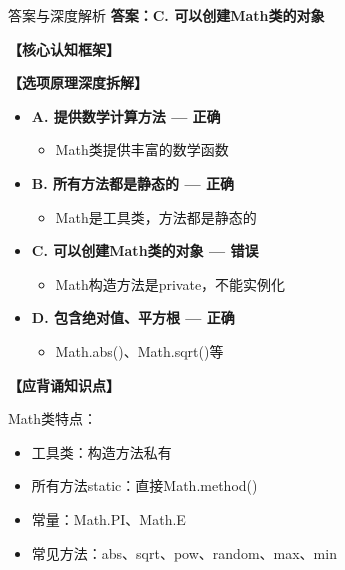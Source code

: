 \documentclass[12pt, a4paper]{ctexart}
\begin{document}
\begin{enumerate}[label=\textbf{\arabic*.}]
	      \begin{bluebox}{答案与深度解析}
		      \textbf{答案：C. 可以创建Math类的对象}

		      \textbf{【核心认知框架】}

		      \textbf{【选项原理深度拆解】}
					  \begin{itemize}[label={}, leftmargin=*, nosep]


		      \item \textbf{A. 提供数学计算方法 — 正确}
					  \begin{itemize}[label={}, nosep]
		      
			      \item Math类提供丰富的数学函数
		      

					  \end{itemize}
		      \item \textbf{B. 所有方法都是静态的 — 正确}
					  \begin{itemize}[label={}, nosep]
		      
			      \item Math是工具类，方法都是静态的
		      

					  \end{itemize}
		      \item \textbf{C. 可以创建Math类的对象 — 错误}
					  \begin{itemize}[label={}, nosep]
		      
			      \item Math构造方法是private，不能实例化
		      

					  \end{itemize}
		      \item \textbf{D. 包含绝对值、平方根 — 正确}
					  \begin{itemize}[label={}, nosep]
		      
			      \item Math.abs()、Math.sqrt()等
		      

		      
					  \end{itemize}
					  \end{itemize}
\textbf{【应背诵知识点】}

		      Math类特点：
		      \begin{itemize}[label={}, nosep]
			      \item 工具类：构造方法私有
			      \item 所有方法static：直接Math.method()
			      \item 常量：Math.PI、Math.E
			      \item 常见方法：abs、sqrt、pow、random、max、min
		      \end{itemize}
	      \end{bluebox}


\end{enumerate}
\end{document}
